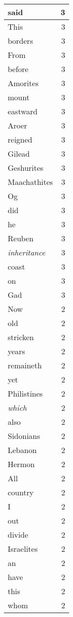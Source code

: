 \begin{center}
\begin{longtable}{l|r}
said & 3\\ \hline 
This & 3\\ \hline 
borders & 3\\ \hline 
From & 3\\ \hline 
before & 3\\ \hline 
Amorites & 3\\ \hline 
mount & 3\\ \hline 
eastward & 3\\ \hline 
Aroer & 3\\ \hline 
reigned & 3\\ \hline 
Gilead & 3\\ \hline 
Geshurites & 3\\ \hline 
Maachathites & 3\\ \hline 
Og & 3\\ \hline 
did & 3\\ \hline 
he & 3\\ \hline 
Reuben & 3\\ \hline 
\emph{inheritance} & 3\\ \hline 
coast & 3\\ \hline 
on & 3\\ \hline 
Gad & 3\\ \hline 
Now & 2\\ \hline 
old & 2\\ \hline 
stricken & 2\\ \hline 
years & 2\\ \hline 
remaineth & 2\\ \hline 
yet & 2\\ \hline 
Philistines & 2\\ \hline 
\emph{which} & 2\\ \hline 
also & 2\\ \hline 
Sidonians & 2\\ \hline 
Lebanon & 2\\ \hline 
Hermon & 2\\ \hline 
All & 2\\ \hline 
country & 2\\ \hline 
I & 2\\ \hline 
out & 2\\ \hline 
divide & 2\\ \hline 
Israelites & 2\\ \hline 
an & 2\\ \hline 
have & 2\\ \hline 
this & 2\\ \hline 
whom & 2\\ \hline 

\end{longtable}
\end{center}
